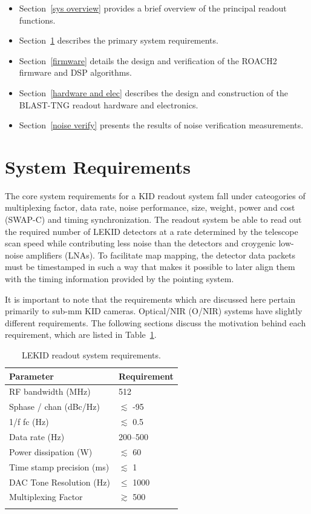 \begin{itemize}[nosep]
  \item Section~\ref{sys overview} provides a brief overview of the principal readout functions.
  \item Section~\ref{sys reqs} describes the primary system requirements.
  \item Section~\ref{firmware} details the design and verification of the ROACH2 firmware and DSP algorithms.
  \item Section~\ref{hardware and elec} describes the design and construction of the BLAST-TNG readout hardware and electronics.
  \item Section~\ref{noise verify} presents the results of noise verification measurements.
\end{itemize}

\section{System Requirements}\label{sys reqs}

The core system requirements for a KID readout system fall under cateogories of multiplexing factor, data rate, noise performance, size, weight, power and cost (SWAP-C) and timing synchronization. The readout system be able to read out the required number of LEKID detectors at a rate determined by the telescope scan speed while contributing less noise than the detectors and croygenic low-noise amplifiers (LNAs). To facilitate map mapping, the detector data packets must be timestamped in such a way that makes it possible to later align them with the timing information provided by the pointing system.

It is important to note that the requirements which are discussed here pertain primarily to sub-mm KID cameras. Optical/NIR (O/NIR) systems have slightly different requirements. The following sections discuss the motivation behind each requirement, which are listed in Table~\ref{tab:sys reqs}.

\begin{table}[!htbp]
\centering
\begin{tabular}{@{}ll@{}}
\dtoprule
Parameter & Requirement \\ \midrule
RF bandwidth (MHz) & 512 \\
\gls{Sphase} / chan (dBc/Hz) & $\lesssim$ -95 \\
1/f \gls{fc} (Hz) & $\lesssim$ 0.5 \\
Data rate (Hz) & 200--500 \\
Power dissipation (W) & $\lesssim$ 60 \\
Time stamp precision (ms) & $\lesssim$ 1 \\
DAC Tone Resolution (Hz) & $\leq$ 1000 \\
Multiplexing Factor & $\gtrsim$ 500 \\ \dbottomrule
\\
\end{tabular}
\caption{LEKID readout system requirements.}
\label{tab:sys reqs}
\end{table}

